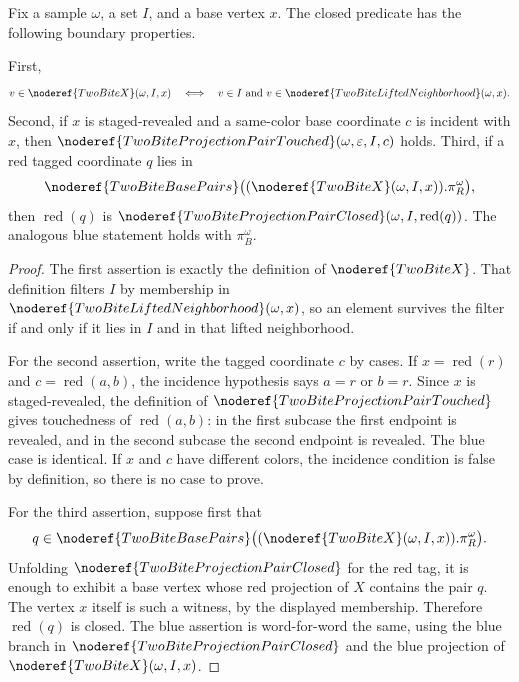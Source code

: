 \begin{helper}
Fix a sample \(\omega\), a set \(I\), and a base vertex \(x\).  The closed
predicate has the following boundary properties.

First,
\[
v\in\noderef{TwoBiteX}(\omega,I,x)
\quad\Longleftrightarrow\quad
v\in I\ \hbox{and}\
v\in\noderef{TwoBiteLiftedNeighborhood}(\omega,x).
\]
Second, if \(x\) is staged-revealed and a same-color base coordinate \(c\) is
incident with \(x\), then
\(\noderef{TwoBiteProjectionPairTouched}(\omega,\varepsilon,I,c)\) holds.
Third, if a red tagged coordinate \(q\) lies in
\[
\noderef{TwoBiteBasePairs}
\bigl((\noderef{TwoBiteX}(\omega,I,x)).\pi_R^\omega\bigr),
\]
then \(\operatorname{red}(q)\) is
\(\noderef{TwoBiteProjectionPairClosed}(\omega,I,\operatorname{red}(q))\).
The analogous blue statement holds with \(\pi_B^\omega\).
\end{helper}
\begin{proof}
The first assertion is exactly the definition of
\(\noderef{TwoBiteX}\).  That definition filters \(I\) by membership in
\(\noderef{TwoBiteLiftedNeighborhood}(\omega,x)\), so an element survives the
filter if and only if it lies in \(I\) and in that lifted neighborhood.

For the second assertion, write the tagged coordinate \(c\) by cases.  If
\(x=\operatorname{red}(r)\) and \(c=\operatorname{red}(a,b)\), the incidence
hypothesis says \(a=r\) or \(b=r\).  Since \(x\) is staged-revealed, the
definition of \(\noderef{TwoBiteProjectionPairTouched}\) gives touchedness of
\(\operatorname{red}(a,b)\): in the first subcase the first endpoint is
revealed, and in the second subcase the second endpoint is revealed.  The
blue case is identical.  If \(x\) and \(c\) have different colors, the
incidence condition is false by definition, so there is no case to prove.

For the third assertion, suppose first that
\[
q\in
\noderef{TwoBiteBasePairs}
\bigl((\noderef{TwoBiteX}(\omega,I,x)).\pi_R^\omega\bigr).
\]
Unfolding \(\noderef{TwoBiteProjectionPairClosed}\) for the red tag, it is
enough to exhibit a base vertex whose red projection of \(X\) contains the
pair \(q\).  The vertex \(x\) itself is such a witness, by the displayed
membership.  Therefore
\(\operatorname{red}(q)\) is closed.  The blue assertion is word-for-word the
same, using the blue branch in
\(\noderef{TwoBiteProjectionPairClosed}\) and the blue projection of
\(\noderef{TwoBiteX}(\omega,I,x)\).
\end{proof}
